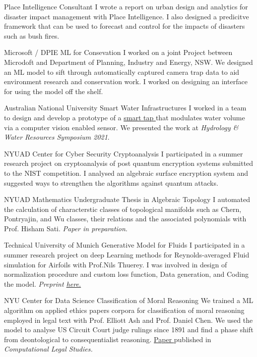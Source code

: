 {Place Intelligence}
{Consultant}
{
	I wrote a report on urban design and analytics for disaster impact management with Place Intelligence. I also designed a predicitve framework that can be used to forecast and control for the impacts of disasters such as bush fires.
}

{Microsoft / DPIE}
{ML for Consevation}
{
	I worked on a joint Project between Microdoft and Department of Planning, Industry and Energy, NSW. We designed an ML model to sift through automatically captured camera trap data to aid environment research and conservation work. I worked on designing an interface for using the model off the shelf.
}

{Australian National University}
{Smart Water Infrastructures}
{
	I worked in a team to design and develop a prototype of a 
	\href{http://tappyvision.herokuapp.com}{
		smart tap
	}that modulates water volume via a computer vision enabled sensor. We presented the work at \textit{Hydrology \& Water Resources Symposium 2021}.
}

{NYUAD Center for Cyber Security}
{Cryptoanalysis}
{
	I participated in a summer research project on cryptoanalysis of post quantum encryption systems submitted to the NIST competition. I analysed an algebraic surface encryption system and suggested ways to strengthen the algorithms against quantum attacks.
}

{NYUAD Mathematics}
{Undergraduate Thesis in Algebraic Topology}
{
	I automated the calculation of characterstic classes of topological manifolds such as Chern, Pontryajin, and Wu classes, their relations and the associated polynomials with Prof. Hisham Sati. \textit{Paper in preparation}.
}

{Technical University of Munich}
{Generative Model for Fluids}
{
	I participated in a summer research project on deep Learning methods for Reynolds-averaged Fluid simulation for Airfoils with Prof.Nils Thuerey. I was involved in design of normalization procedure and custom loss function, Data generation, and Coding the model. 
	\textit{ Preprint
		\href{https://www.researchgate.net/publication/328418525_Well_how_accurate_is_it_A_Study_of_Deep_Learning_Methods_for_Reynolds-Averaged_Navier-Stokes_Simulations}{
		here.
		}
	}
}

{NYU Center for Data Science}
{Classification of Moral Reasoning}
{
	We trained a ML algorithm on applied ethics papers corpora for classification of moral reasoning employed in legal text with Prof. Elliott Ash and Prof. Daniel Chen. We used the model to analyse US Circuit Court judge rulings since 1891 and find a phase shift from deontological to consequentialist reasoning.
	\href{https://papers.ssrn.com/sol3/papers.cfm?abstract_id=3205286}{
		Paper
		}published in \textit{Computational Legal Studies.}
}


